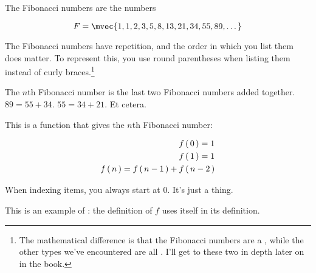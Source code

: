 \begin{example}
   The Fibonacci numbers are the numbers 

   \begin{equation}
       F = \mvec{1,1,2,3,5,8,13,21,34,55,89, \dots}
   \end{equation}


   The Fibonacci numbers have repetition, and the order in which you list them
   does matter. To represent this, you use round parentheses when listing them
   instead of curly braces.\footnote{The mathematical difference is that the
     Fibonacci numbers are a , while the other types we've
     encountered are all . I'll get to these two in depth later on in
     the book.}

   The $n$th Fibonacci number is the last two Fibonacci numbers added
   together. $89 = 55 + 34$. $55 = 34 + 21$. Et cetera.

   This is a function that gives the $n$th Fibonacci number:

   \begin{eqnarray}
       f \left(\, 0 \,\right) = 1 \\
       f \left(\, 1 \,\right) = 1 \\
       f \left(\, n \,\right) = f \left(\, n - 1 \,\right) + f \left(\, n - 2 \,\right)
   \end{eqnarray}

   When indexing items, you always start at $0$. It's just a thing.

   This is an example of : the definition of $f$ uses itself in
   its definition.
\end{example}

